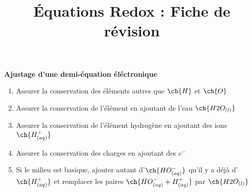\documentclass[10pt,a4paper,twocolumn,landscape]{article}
\begin{document}
\pagestyle{fancy}
\fancyhead{}

\title{Équations Redox : Fiche de révision}

\fancyhead[C]{\thetitle}

\begin{center}{\large \bf Ajustage d'une demi-équation éléctronique}\end{center}

\begin{tcolorbox}[colback=white,colframe=black]
    \begin{enumerate}
        \item Assurer la conservation des éléments autres que $\ch{H}$ et  $\ch{O}$
        \item Assurer la conservation de l'élément en ajoutant de l'eau $\ch{H2O_{(l)}}$
        \item Assurer la conservation de l'élément hydrogène en ajoutant des ions $\ch{H^+_{(aq)}}$
        \item Assurer la conservation des charges en ajoutant des $e^-$
        \item Si le milieu est basique, ajouter autant d'$\ch{HO^-_{(aq)}}$ qu'il y a déjà d'$\ch{H^+_{(aq)}}$ et remplacer les paires $\ch{HO^-_{(aq)} + H^+_{(aq)}}$ par $\ch{H2O_{(l)}}$
    \end{enumerate}    
\end{tcolorbox}
\end{document}
